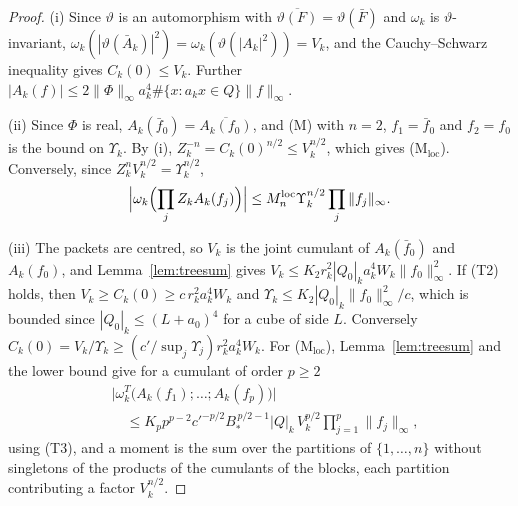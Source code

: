 \documentclass[aps,prd,twocolumn,superscriptaddress,nofootinbib,longbibliography,floatfix,amsmath,amssymb,10pt]{revtex4-2}
\theoremstyle{definition}
\theoremstyle{remark}
\begin{document}
\begin{proof}
(i) Since $\vartheta$ is an automorphism with $\overline{\vartheta(F)}=
\vartheta(\bar F)$ and $\omega_k$ is $\vartheta$-invariant,
$\omega_k(|\vartheta(\bar A_k)|^2)=\omega_k(\vartheta(|A_k|^2))=V_k$, and
the Cauchy--Schwarz inequality gives $C_k(0)\le V_k$. Further
$|A_k(f)|\le2\|\Phi\|_\infty a_k^4\#\{x:a_kx\in Q\}\|f\|_\infty$.

(ii) Since $\Phi$ is real, $A_k(\bar f_0)=\overline{A_k(f_0)}$, and (M)
with $n=2$, $f_1=\bar f_0$ and $f_2=f_0$ is the bound on $\Upsilon_k$. By
(i), $Z_k^{-n}=C_k(0)^{n/2}\le V_k^{n/2}$, which gives
(M$_{\mathrm{loc}}$). Conversely, since $Z_k^nV_k^{n/2}=\Upsilon_k^{n/2}$,
\[
\Bigl|\omega_k\Bigl(\prod_jZ_kA_k(f_j)\Bigr)\Bigr|\le
M^{\mathrm{loc}}_n\Upsilon_k^{n/2}\prod_j\|f_j\|_\infty .
\]

(iii) The packets are centred, so $V_k$ is the joint cumulant of
$A_k(\bar f_0)$ and $A_k(f_0)$, and Lemma~\ref{lem:treesum} gives
$V_k\le K_2r_k^2|Q_0|_ka_k^4W_k\|f_0\|_\infty^2$. If (T2) holds, then
$V_k\ge C_k(0)\ge c\,r_k^2a_k^4W_k$ and $\Upsilon_k\le K_2|Q_0|_k
\|f_0\|_\infty^2/c$, which is bounded since $|Q_0|_k\le(L+a_0)^4$ for a
cube of side $L$. Conversely $C_k(0)=V_k/\Upsilon_k\ge(c'/\sup_j\Upsilon_j)
r_k^2a_k^4W_k$. For (M$_{\mathrm{loc}}$), Lemma~\ref{lem:treesum} and the
lower bound give for a cumulant of order $p\ge2$
\[
\begin{split}
&\bigl|\omega^T_k\bigl(A_k(f_1);\dots;A_k(f_p)\bigr)\bigr|\\
&\quad\le K_pp^{p-2}c'^{-p/2}B_*^{\,p/2-1}|Q|_k\,V_k^{p/2}
\prod_{j=1}^p\|f_j\|_\infty ,
\end{split}
\]
using (T3), and a moment is the sum over the partitions of
$\{1,\dots,n\}$ without singletons of the products of the cumulants of the
blocks, each partition contributing a factor $V_k^{n/2}$.


\end{proof}
\end{document}
